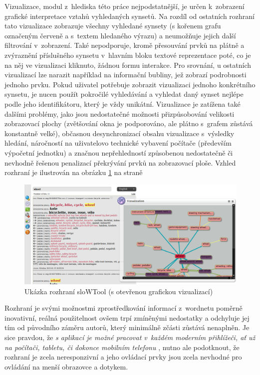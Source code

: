 \documentclass[a4paper, 11pt, oneside, showtrims]{book}
\begin{document}
					Vizualizace, modul z~hlediska této práce nejpodstatnější, je určen k~zobrazení grafické interpretace vztahů vyhledaných synsetů. Na rozdíl od ostatních rozhraní tato vizualizace zobrazuje všechny vyhledané synsety (s kořenem grafu označeným červeně a s~textem hledaného výrazu) a neumožňuje jejich další filtrování v~zobrazení. Také nepodporuje, kromě přesouvání prvků na plátně a zvýraznění příslušného synsetu v~hlavním bloku textové reprezentace poté, co je na něj ve vizualizaci kliknuto, žádnou formu interakce. Pro srovnání, u ostatních vizualizací lze narazit například na informační bubliny, jež zobrazí podrobnosti jednoho prvku. Pokud uživatel potřebuje zobrazit vizualizaci jednoho konkrétního synsetu, je nucen použít pokročilé vyhledávání a vyhledat daný synset nejlépe podle jeho identifikátoru, který je vždy unikátní. Vizualizace je zatížena také dalšími problémy, jako jsou nedostatečné možnosti přizpůsobování velikosti zobrazovací plochy (zvětšování okna je podporováno, ale plátno s~grafem zůstává konstantně velké), občasnou desynchronizací obsahu vizualizace s~výsledky hledání, náročností na uživatelovo technické vybavení počítače (především výpočetní jednotku) a značnou nepřehledností způsobenou nedostatečně či nevhodně řešenou penalizací překrývání prvků na zobrazovací ploše. Vzhled rozhraní je ilustrován na obrázku \ref{fig:slowtool} na straně \pageref{fig:slowtool}

					\begin{figure}[h]
						\centering
						\includegraphics[width=1.0\textwidth]{slowtool.png}
						\caption{Ukázka rozhraní sloWTool (s otevřenou grafickou vizualizací)}
						\label{fig:slowtool}
					\end{figure}

					Rozhraní je svými možnostmi zprostředkování informací z~wordnetu poměrně inovativní, reálná použitelnost ovšem trpí zmíněnými nedostatky a odchyluje jej tím od původního záměru autorů, který minimálně zčásti zůstává nenaplněn. Je sice pravdou, že \textit{s aplikací je možné pracovat v~každém moderním přihlížeči, ať už na počítači, tabletu, či dokonce mobilním telefonu} \parencite{fivser2011visualizing}, nutno ale podotknout, že rozhraní je zcela neresponzivní a jeho ovládací prvky jsou zcela nevhodné pro ovládání na menší obrazovce a dotykem.
\end{document}

